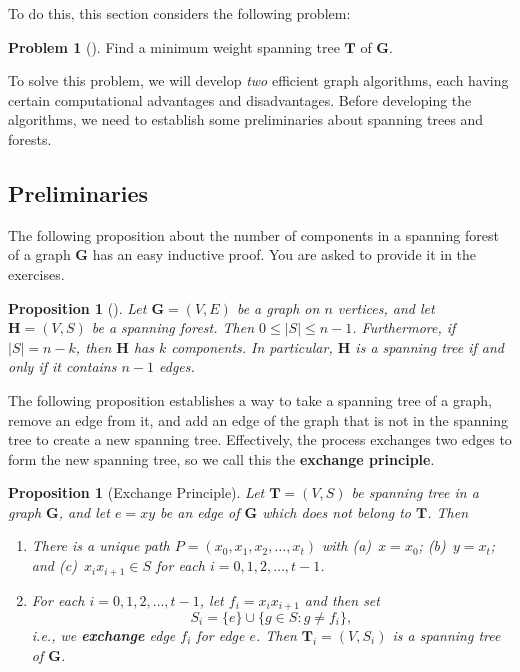 \documentclass[10pt,]{book}
\newcommand{\terminology}[1]{\textbf{#1}}
\theoremstyle{plain}
\newtheorem{proposition}[theorem]{Proposition}
\theoremstyle{definition}
\theoremstyle{definition}
\theoremstyle{definition}
\newtheorem{problem}[theorem]{Problem}
\theoremstyle{definition}
\numberwithin{equation}{section}
\newcommand{\GVE}{\mathbf{G}=(V,E)}
\newcommand{\bfG}{\mathbf{G}}
\newcommand{\bfH}{\mathbf{H}}
\newcommand{\bfT}{\mathbf{T}}
\begin{document}
\hypertarget{p-162}{}%
To do this, this section considers the following problem:%
\begin{problem}[]\label{problem-1}
\hypertarget{p-163}{}%
Find a minimum weight spanning tree \(\bfT\) of \(\bfG\).%
\end{problem}
\hypertarget{p-164}{}%
To solve this problem, we will develop \emph{two} efficient graph algorithms, each having certain computational advantages and disadvantages. Before developing the algorithms, we need to establish some preliminaries about spanning trees and forests.%
\typeout{************************************************}
\typeout{************************************************}
\subsection[{Preliminaries}]{Preliminaries}\label{subsection-19}
\hypertarget{p-165}{}%
The following proposition about the number of components in a spanning forest of a graph \(\bfG\) has an easy inductive proof. You are asked to provide it in the exercises.%
\begin{proposition}[{}]\label{prop_graphalgorithms_spanforest}
\hypertarget{p-166}{}%
Let \(\GVE\) be a graph on \(n\) vertices, and let \(\bfH=(V,S)\) be a spanning forest. Then \(0\le |S|\le n-1\). Furthermore, if \(|S|= n-k\), then \(\bfH\) has \(k\) components. In particular, \(\bfH\) is a spanning tree if and only if it contains \(n-1\) edges.%
\end{proposition}
\hypertarget{p-167}{}%
The following proposition establishes a way to take a spanning tree of a graph, remove an edge from it, and add an edge of the graph that is not in the spanning tree to create a new spanning tree. Effectively, the process exchanges two edges to form the new spanning tree, so we call this the \terminology{exchange principle}.%
\begin{proposition}[{Exchange Principle}]\label{prop_graphalgorithms_exchange}
\hypertarget{p-168}{}%
Let \(\bfT=(V,S)\) be spanning tree in a graph \(\bfG\), and let \(e=xy\) be an edge of \(\bfG\) which does not belong to \(\bfT\). Then \leavevmode%
\begin{enumerate}
\item\hypertarget{li-41}{}\hypertarget{p-169}{}%
There is a \emph{unique} path \(P=(x_0,x_1,x_2,\dots,x_t)\) with (a)~\(x=x_0\); (b)~\(y=x_t\); and (c)~\(x_ix_{i+1}\in S\) for each \(i=0,1,2,\dots,t-1\).%
\item\hypertarget{li-42}{}\hypertarget{p-170}{}%
For each \(i=0,1,2,\dots,t-1\), let \(f_i=x_ix_{i+1}\) and then set%
\begin{equation*}
S_i = \{e\}\cup\{g\in S: g\neq f_i\},
\end{equation*}
i.e.\@, we \terminology{exchange} edge \(f_i\) for edge \(e\). Then \(\bfT_i=(V,S_i)\) is a spanning tree of \(\bfG\).%
\end{enumerate}
%
\end{proposition}
\end{document}
